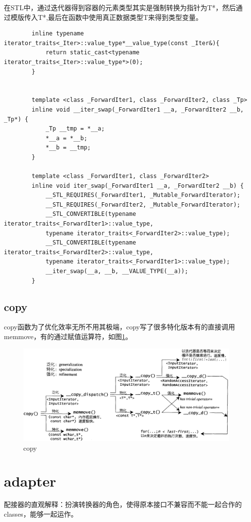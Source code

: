 \documentclass[a4paper,fontset=mac]{ctexart}
\begin{document}
	 在STL中，通过迭代器得到容器的元素类型其实是强制转换为指针为{\color{red}T*}，然后通过模版传入T*,最后在函数中使用真正数据类型T来得到类型变量。
	 \begin{lstlisting}
	 	inline typename iterator_traits<_Iter>::value_type*__value_type(const _Iter&){
		 	return static_cast<typename iterator_traits<_Iter>::value_type*>(0);
	 	}
	 	
	 	
		template <class _ForwardIter1, class _ForwardIter2, class _Tp>
		inline void __iter_swap(_ForwardIter1 __a, _ForwardIter2 __b, _Tp*) {
			_Tp __tmp = *__a;
			*__a = *__b;
			*__b = __tmp;
		}
		
		template <class _ForwardIter1, class _ForwardIter2>
		inline void iter_swap(_ForwardIter1 __a, _ForwardIter2 __b) {
			__STL_REQUIRES(_ForwardIter1, _Mutable_ForwardIterator);
			__STL_REQUIRES(_ForwardIter2, _Mutable_ForwardIterator);
			__STL_CONVERTIBLE(typename iterator_traits<_ForwardIter1>::value_type,
			typename iterator_traits<_ForwardIter2>::value_type);
			__STL_CONVERTIBLE(typename iterator_traits<_ForwardIter2>::value_type,
			typename iterator_traits<_ForwardIter1>::value_type);
			__iter_swap(__a, __b, __VALUE_TYPE(__a));
		}
	 \end{lstlisting}
	 
	 
	 \subsection{copy}
	 copy函数为了优化效率无所不用其极端，copy写了很多特化版本有的直接调用memmove，有的通过赋值运算符，如图\ref{copy}。
	 \begin{figure}
	 	\centering
	 	\includegraphics[width=6in]{copy}
	 	\caption{copy}
	 	\label{copy} %
	 \end{figure}
 
 
 	
 	\section{adapter}
 	配接器的直观解释：扮演转换器的角色，使得原本接口不兼容而不能一起合作的classes，能够一起运作。
 	
\end{document}
